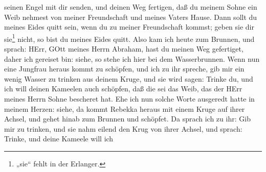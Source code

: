 \begin{schriftzitat}
seinen Engel mit dir senden, und deinen Weg fertigen, daß du meinem Sohne ein Weib nehmest von meiner Freundschaft und meines Vaters Hause. Dann sollt du meines Eides quitt sein, wenn du zu meiner Freundschaft kommst; geben sie dir sie\footnote{„sie“ fehlt in der Erlanger.} nicht, so bist du meines Eides quitt. Also kam ich heute zum Brunnen, und sprach: HErr, GOtt meines Herrn Abraham, hast du meinen Weg gefertiget, daher ich gereiset bin: siehe, so stehe ich hier bei dem Wasserbrunnen. Wenn nun eine Jungfrau heraus kommt zu schöpfen, und ich zu ihr spreche, gib mir ein wenig Wasser zu trinken aus deinem Kruge, und sie wird sagen: Trinke du, und ich will deinen Kameelen auch schöpfen, daß die sei das Weib, das der HErr meines Herrn Sohne bescheret hat. Ehe ich nun solche Worte ausgeredt hatte in meinem Herzen: siehe, da kommt Rebekka heraus mit einem Kruge auf ihrer Achsel, und gehet hinab zum Brunnen und schöpfet. Da sprach ich zu ihr: Gib mir zu trinken, und sie nahm eilend den Krug von ihrer Achsel, und sprach: Trinke, und deine Kameele will ich

\end{schriftzitat}
